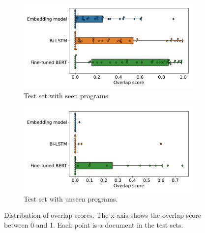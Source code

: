 \begin{figure}
    \centering
    \begin{subfigure}[h]{0.45\textwidth}
\includegraphics[width=\textwidth]{paper/figs/overlap_swarm_seen.pdf}
        \caption{Test set with seen programs.}
        \label{fig:overlap_seen}
    \end{subfigure}
    \begin{subfigure}[h]{0.45\textwidth}
        \includegraphics[width=\textwidth]{paper/figs/overlap_swarm_unseen.pdf}
        \caption{Test set with unseen programs.}
        \label{fig:overlap_unseen}
    \end{subfigure}
    \caption{Distribution of overlap scores. The x-axis shows the overlap score between 0 and 1. Each point is a document in the test sets. }\label{fig:overlap_swarm}
\end{figure}


